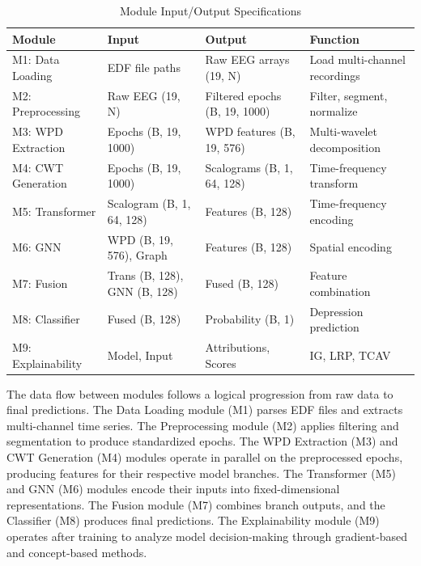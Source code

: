 \begin{table}[H]
    \centering
    \small
    \caption{Module Input/Output Specifications}
    \label{tab:modules}
    \begin{tabularx}{\textwidth}{|L{2cm}|L{3cm}|L{3cm}|X|}
        \hline
        \textbf{Module} & \textbf{Input} & \textbf{Output} & \textbf{Function} \\
        \hline
        M1: Data Loading & EDF file paths & Raw EEG arrays (19, N) & Load multi-channel recordings \\
        \hline
        M2: Preprocessing & Raw EEG (19, N) & Filtered epochs (B, 19, 1000) & Filter, segment, normalize \\
        \hline
        M3: WPD Extraction & Epochs (B, 19, 1000) & WPD features (B, 19, 576) & Multi-wavelet decomposition \\
        \hline
        M4: CWT Generation & Epochs (B, 19, 1000) & Scalograms (B, 1, 64, 128) & Time-frequency transform \\
        \hline
        M5: Transformer & Scalogram (B, 1, 64, 128) & Features (B, 128) & Time-frequency encoding \\
        \hline
        M6: GNN & WPD (B, 19, 576), Graph & Features (B, 128) & Spatial encoding \\
        \hline
        M7: Fusion & Trans (B, 128), GNN (B, 128) & Fused (B, 128) & Feature combination \\
        \hline
        M8: Classifier & Fused (B, 128) & Probability (B, 1) & Depression prediction \\
        \hline
        M9: Explainability & Model, Input & Attributions, Scores & IG, LRP, TCAV \\
        \hline
    \end{tabularx}
\end{table}

The data flow between modules follows a logical progression from raw data to final predictions. The Data Loading module (M1) parses EDF files and extracts multi-channel time series. The Preprocessing module (M2) applies filtering and segmentation to produce standardized epochs. The WPD Extraction (M3) and CWT Generation (M4) modules operate in parallel on the preprocessed epochs, producing features for their respective model branches. The Transformer (M5) and GNN (M6) modules encode their inputs into fixed-dimensional representations. The Fusion module (M7) combines branch outputs, and the Classifier (M8) produces final predictions. The Explainability module (M9) operates after training to analyze model decision-making through gradient-based and concept-based methods.

